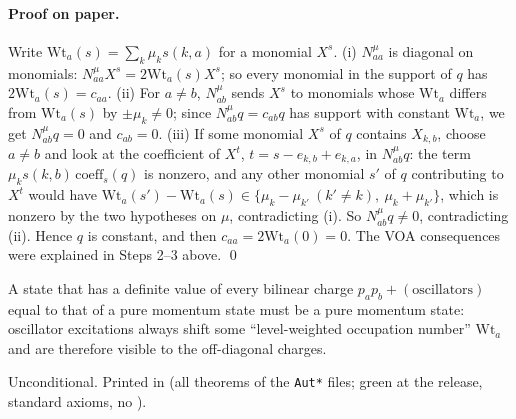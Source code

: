 \paragraph{Proof on paper.}  Write $\mathrm{Wt}_a(s)=\sum_k\mu_k s(k,a)$ for a monomial $X^s$.  (i) $N^\mu_{aa}$ is
diagonal on monomials: $N^\mu_{aa}X^s=2\mathrm{Wt}_a(s)X^s$; so every monomial in the support of $q$ has
$2\mathrm{Wt}_a(s)=c_{aa}$.  (ii) For $a\neq b$, $N^\mu_{ab}$ sends $X^s$ to monomials whose $\mathrm{Wt}_a$ differs from
$\mathrm{Wt}_a(s)$ by $\pm\mu_k\ne0$; since $N^\mu_{ab}q=c_{ab}q$ has support with constant $\mathrm{Wt}_a$, we get
$N^\mu_{ab}q=0$ and $c_{ab}=0$.  (iii) If some monomial $X^s$ of $q$ contains $X_{k,b}$, choose $a\neq b$ and look at
the coefficient of $X^t$, $t=s-e_{k,b}+e_{k,a}$, in $N^\mu_{ab}q$: the term $\mu_k s(k,b)\,\mathrm{coeff}_s(q)$ is
nonzero, and any other monomial $s'$ of $q$ contributing to $X^t$ would have
$\mathrm{Wt}_a(s')-\mathrm{Wt}_a(s)\in\{\mu_k-\mu_{k'}\ (k'\ne k),\ \mu_k+\mu_{k'}\}$, which is nonzero by the two hypotheses on
$\mu$, contradicting (i).  So $N^\mu_{ab}q\ne0$, contradicting (ii).  Hence $q$ is constant, and then
$c_{aa}=2\mathrm{Wt}_a(0)=0$.  The VOA consequences were explained in Steps 2--3 above. \qed
\begin{physics}
A state that has a definite value of every bilinear charge $p_ap_b+(\text{oscillators})$ equal to that of a pure momentum
state must be a pure momentum state: oscillator excitations always shift some ``level-weighted occupation number''
$\mathrm{Wt}_a$ and are therefore visible to the off-diagonal charges.
\end{physics}
\begin{status}
Unconditional.  Printed in  (all theorems of the \texttt{Aut*} files; green at the release, standard axioms, no ).
\end{status}

